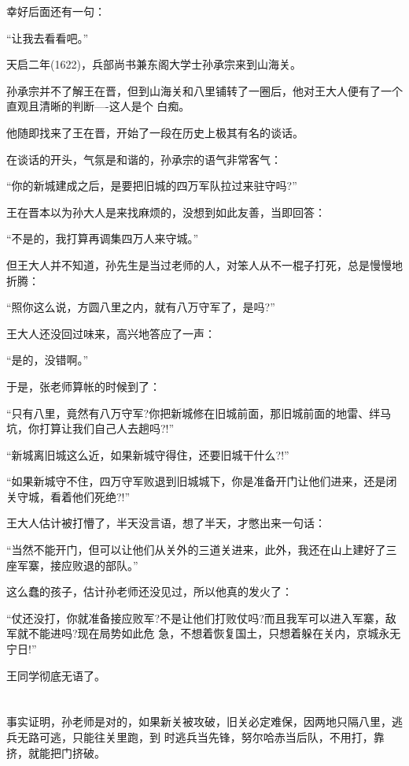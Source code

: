 \documentclass[11pt,a4paper,onecolumn]{article}
\begin{document}
幸好后面还有一句：

``让我去看看吧。''

天启二年(1622)，兵部尚书兼东阁大学士孙承宗来到山海关。

孙承宗并不了解王在晋，但到山海关和八里铺转了一圈后，他对王大人便有了一个直观且清晰的判断----这人是个
白痴。

他随即找来了王在晋，开始了一段在历史上极其有名的谈话。

在谈话的开头，气氛是和谐的，孙承宗的语气非常客气：

``你的新城建成之后，是要把旧城的四万军队拉过来驻守吗?''

王在晋本以为孙大人是来找麻烦的，没想到如此友善，当即回答：

``不是的，我打算再调集四万人来守城。''

但王大人并不知道，孙先生是当过老师的人，对笨人从不一棍子打死，总是慢慢地折腾：

``照你这么说，方圆八里之内，就有八万守军了，是吗?''

王大人还没回过味来，高兴地答应了一声：

``是的，没错啊。''

于是，张老师算帐的时候到了：

``只有八里，竟然有八万守军?你把新城修在旧城前面，那旧城前面的地雷、绊马坑，你打算让我们自己人去趟吗?!''

``新城离旧城这么近，如果新城守得住，还要旧城干什么?!''

``如果新城守不住，四万守军败退到旧城城下，你是准备开门让他们进来，还是闭关守城，看着他们死绝?!''

王大人估计被打懵了，半天没言语，想了半天，才憋出来一句话：

``当然不能开门，但可以让他们从关外的三道关进来，此外，我还在山上建好了三座军寨，接应败退的部队。''

这么蠢的孩子，估计孙老师还没见过，所以他真的发火了：

``仗还没打，你就准备接应败军?不是让他们打败仗吗?而且我军可以进入军寨，敌军就不能进吗?现在局势如此危
急，不想着恢复国土，只想着躲在关内，京城永无宁日!''

王同学彻底无语了。

\section[\thesection]{}

事实证明，孙老师是对的，如果新关被攻破，旧关必定难保，因两地只隔八里，逃兵无路可逃，只能往关里跑，到
时逃兵当先锋，努尔哈赤当后队，不用打，靠挤，就能把门挤破。
\end{document}

